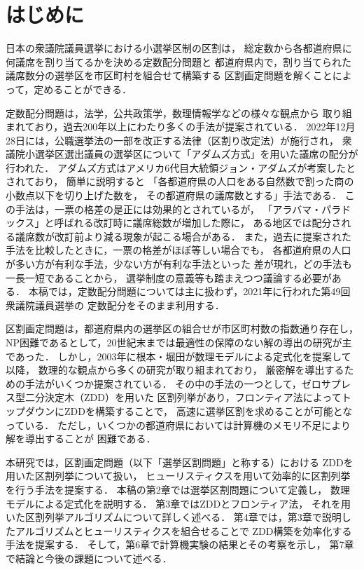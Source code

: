 \chapter{はじめに} \label{chapter:1}
日本の衆議院議員選挙における小選挙区制の区割は，
総定数から各都道府県に何議席を割り当てるかを決める定数配分問題と
都道府県内で，割り当てられた議席数分の選挙区を市区町村を組合せて構築する
区割画定問題を解くことによって，定めることができる．

定数配分問題は，法学，公共政策学，数理情報学などの様々な観点から
取り組まれており，過去200年以上にわたり多くの手法が提案されている．
2022年12月28日には，公職選挙法の一部を改正する法律（区割り改定法）が施行され，
衆議院小選挙区選出議員の選挙区について「アダムズ方式」を用いた議席の配分が行われた\cite{ichimori}．
アダムズ方式はアメリカ6代目大統領ジョン・アダムズが考案したとされており，
簡単に説明すると
「各都道府県の人口をある自然数で割った商の小数点以下を切り上げた数を，
その都道府県の議席数とする」手法である．
この手法は，一票の格差の是正には効果的とされているが，
「アラバマ・パラドックス」と呼ばれる改訂時に議席総数が増加した際に，
ある地区では配分される議席数が改訂前より減る現象が起こる場合がある．
また，過去に提案された手法を比較したときに，一票の格差がほぼ等しい場合でも，
各都道府県の人口が多い方が有利な手法，少ない方が有利な手法といった
差が現れ，どの手法も一長一短であることから，
選挙制度の意義等も踏まえつつ議論する必要がある．
本稿では，定数配分問題については主に扱わず，2021年に行われた第49回衆議院議員選挙の
定数配分をそのまま利用する．

区割画定問題は，都道府県内の選挙区の組合せが市区町村数の指数通り存在し，
NP困難であるとして，20世紀末までは最適性の保障のない解の導出の研究が主であった．
しかし，2003年に根本・堀田が数理モデルによる定式化を提案\cite{nemoto}して以降，
数理的な観点から多くの研究が取り組まれており，
厳密解を導出するための手法がいくつか提案されている．
その中の手法の一つとして，ゼロサプレス型二分決定木（ZDD）を用いた
区割列挙があり，フロンティア法によってトップダウンにZDDを構築することで，
高速に選挙区割を求めることが可能となっている．
ただし，いくつかの都道府県においては計算機のメモリ不足により解を導出することが
困難である．

本研究では，区割画定問題（以下「選挙区割問題」と称する）における
ZDDを用いた区割列挙について扱い，
ヒューリスティクスを用いて効率的に区割列挙を行う手法を提案する．
本稿の第2章では選挙区割問題について定義し，
数理モデルによる定式化を説明する．
第3章ではZDDとフロンティア法，
それを用いた区割列挙アルゴリズムについて詳しく述べる．
第4章では，第3章で説明したアルゴリズムとヒューリスティクスを組合せることで
ZDD構築を効率化する手法を提案する．
そして，第6章で計算機実験の結果とその考察を示し，
第7章で結論と今後の課題について述べる．
